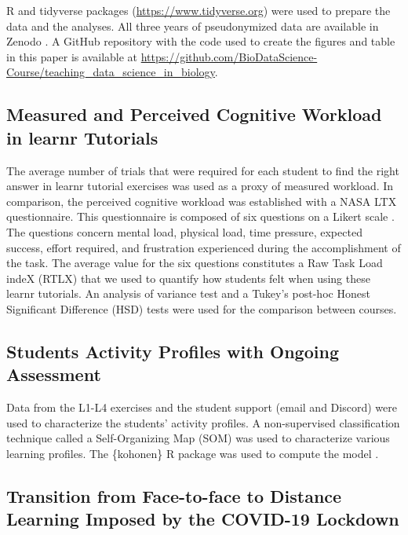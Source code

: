 \documentclass{aims}
\theoremstyle{definition}
\begin{document}
R and tidyverse \cite{Wickham2019} packages
(\url{https://www.tidyverse.org}) were used to prepare the data and the
analyses. All three years of pseudonymized data are available in Zenodo
\cite{Grosjeandataset2020, Grosjeandataset2019, Grosjeandataset2018}. A
GitHub repository with the code used to create the figures and table in
this paper is available at
\url{https://github.com/BioDataScience-Course/teaching_data_science_in_biology}.

\hypertarget{measured-and-perceived-cognitive-workload-in-learnr-tutorials}{%
\subsection{Measured and Perceived Cognitive Workload in learnr
Tutorials}\label{measured-and-perceived-cognitive-workload-in-learnr-tutorials}}

The average number of trials that were required for each student to find
the right answer in learnr tutorial exercises was used as a proxy of
measured workload. In comparison, the perceived cognitive workload was
established with a NASA LTX questionnaire. This questionnaire is
composed of six questions on a Likert scale \cite{Hart1988}. The
questions concern mental load, physical load, time pressure, expected
success, effort required, and frustration experienced during the
accomplishment of the task. The average value for the six questions
constitutes a Raw Task Load indeX (RTLX) \cite{Byers1989} that we used
to quantify how students felt when using these learnr tutorials. An
analysis of variance test and a Tukey's post-hoc Honest Significant
Difference (HSD) tests were used for the comparison between courses.

\hypertarget{students-activity-profiles-with-ongoing-assessment}{%
\subsection{Students Activity Profiles with Ongoing
Assessment}\label{students-activity-profiles-with-ongoing-assessment}}

Data from the L1-L4 exercises and the student support (email and
Discord) were used to characterize the students' activity profiles. A
non-supervised classification technique called a Self-Organizing Map
(SOM) \cite{Kohonen1995} was used to characterize various learning
profiles. The \{kohonen\} R package was used to compute the model
\cite{Wehrens2018}.

\hypertarget{transition-from-face-to-face-to-distance-learning-imposed-by-the-covid-19-lockdown}{%
\subsection{Transition from Face-to-face to Distance Learning Imposed by
the COVID-19
Lockdown}\label{transition-from-face-to-face-to-distance-learning-imposed-by-the-covid-19-lockdown}}
\end{document}
